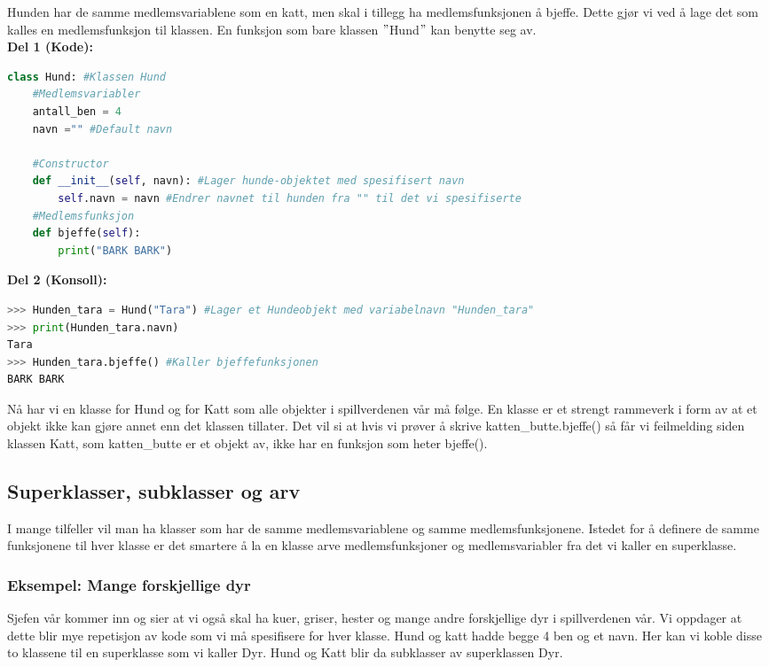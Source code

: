 Hunden har de samme medlemsvariablene som en katt, men skal i tillegg ha medlemsfunksjonen å bjeffe. Dette gjør vi ved å lage det som kalles en medlemsfunksjon til klassen. En funksjon som bare klassen $"$Hund$"$ kan benytte seg av.\\[0.5cm]
\textbf{Del 1 (Kode):}
\begin{lstlisting}[language=python]
class Hund: #Klassen Hund
    #Medlemsvariabler
    antall_ben = 4 
    navn ="" #Default navn
    
    #Constructor
    def __init__(self, navn): #Lager hunde-objektet med spesifisert navn
        self.navn = navn #Endrer navnet til hunden fra "" til det vi spesifiserte
    #Medlemsfunksjon
    def bjeffe(self): 
        print("BARK BARK")
\end{lstlisting}
\textbf{Del 2 (Konsoll):}
\begin{lstlisting}[language=python]
>>> Hunden_tara = Hund("Tara") #Lager et Hundeobjekt med variabelnavn "Hunden_tara"
>>> print(Hunden_tara.navn) 
Tara
>>> Hunden_tara.bjeffe() #Kaller bjeffefunksjonen
BARK BARK
\end{lstlisting}

Nå har vi en klasse for Hund og for Katt som alle objekter i spillverdenen vår må følge. En klasse er et strengt rammeverk i form av at et objekt ikke kan gjøre annet enn det klassen tillater. Det vil si at hvis vi prøver å skrive katten\_butte.bjeffe() så får vi feilmelding siden klassen Katt, som katten\_butte er et objekt av, ikke har en funksjon som heter bjeffe(). 

\clearpage
\subsection{Superklasser, subklasser og arv}
I mange tilfeller vil man ha klasser som har de samme medlemsvariablene og samme medlemsfunksjonene. Istedet for å definere de samme funksjonene til hver klasse er det smartere å la en klasse arve medlemsfunksjoner og medlemsvariabler fra det vi kaller en superklasse. 

\subsubsection{Eksempel: Mange forskjellige dyr}
Sjefen vår kommer inn og sier at vi også skal ha kuer, griser, hester og mange andre forskjellige dyr i spillverdenen vår. Vi oppdager at dette blir mye repetisjon av kode som vi må spesifisere for hver klasse. Hund og katt hadde begge 4 ben og et navn. Her kan vi koble disse to klassene til en superklasse som vi kaller Dyr. Hund og Katt blir da subklasser av superklassen Dyr.\\[2cm]


